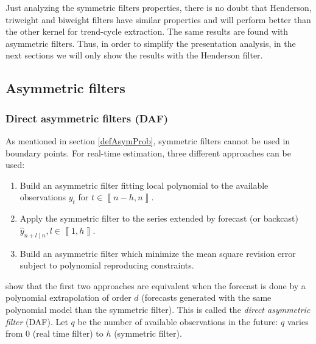 \documentclass[
  12pt,
  ,
  a4paper]{article}
\newcommand\1{\mathds{1}}
\begin{document}
Just analyzing the symmetric filters properties, there is no doubt that Henderson, triweight and biweight filters have similar properties and will perform better than the other kernel for trend-cycle extraction.
The same results are found with asymmetric filters.
Thus, in order to simplify the presentation analysis, in the next sections we will only show the results with the Henderson filter.

\hypertarget{asymmetric-filters}{%
\subsection{Asymmetric filters}\label{asymmetric-filters}}

\hypertarget{direct-asymmetric-filters-daf}{%
\subsubsection{Direct asymmetric filters (DAF)}\label{direct-asymmetric-filters-daf}}

As mentioned in section \ref{defAsymProb}, symmetric filters cannot be used in boundary points. For real-time estimation, three different approaches can be used:

\begin{enumerate}
\def\labelenumi{\arabic{enumi}.}
\item
  Build an asymmetric filter fitting local polynomial to the available observations \(y_{t}\) for \(t\in\left\llbracket n-h,n\right\rrbracket\).
\item
  Apply the symmetric filter to the series extended by forecast (or backcast) \(\hat{y}_{n+l\mid n},l\in\left\llbracket 1,h\right\rrbracket\).
\item
  Build an asymmetric filter which minimize the mean square revision error subject to polynomial reproducing constraints.
\end{enumerate}

\textcite{proietti2008} show that the first two approaches are equivalent when the forecast is done by a polynomial extrapolation of order \(d\) (forecasts generated with the same polynomial model than the symmetric filter).
This is called the \emph{direct asymmetric filter} (DAF).
Let \(q\) be the number of available observations in the future: \(q\) varies from 0 (real time filter) to \(h\) (symmetric filter).
\end{document}
